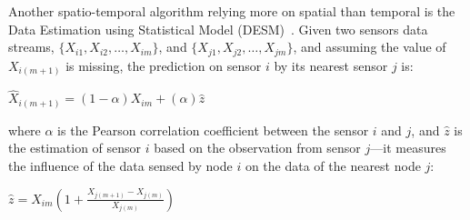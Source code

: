 Another spatio-temporal algorithm relying more on spatial than temporal is the Data Estimation using Statistical Model (DESM)~\cite{li2008data}.  
Given two sensors data streams, $\{X_{i1},X_{i2},\dots,X_{im}\}$, and $\{X_{j1},X_{j2},\dots,X_{jm}\}$, and assuming
the value of $X_{i(m+1)}$ is missing,
the prediction on sensor $i$ by its nearest sensor $j$ is:
\begin{center}
$\hat{X}_{i(m+1)} = (1-\alpha)X_{im} + (\alpha)\hat{z}$
\end{center}
where $\alpha$ is the Pearson correlation coefficient between the sensor $i$ and $j$, and $\hat{z}$ is the estimation of sensor $i$ 
based on the observation from sensor $j$---it measures the influence of the data sensed by node $i$ on the data of 
the nearest node $j$:
\begin{center}
$\hat{z} = X_{im}(1+\frac{X_{j(m+1)}-X_{j(m)}}{X_{j(m)}})$
\end{center}

